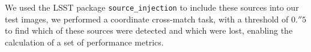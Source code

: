 We used the \gls{LSST} package \texttt{source\_injection} to include these sources into our test images, we performed a coordinate cross-match task, with a threshold of $0.''5$ to find which of these sources were detected and which were lost, enabling the calculation of a set of performance metrics.

